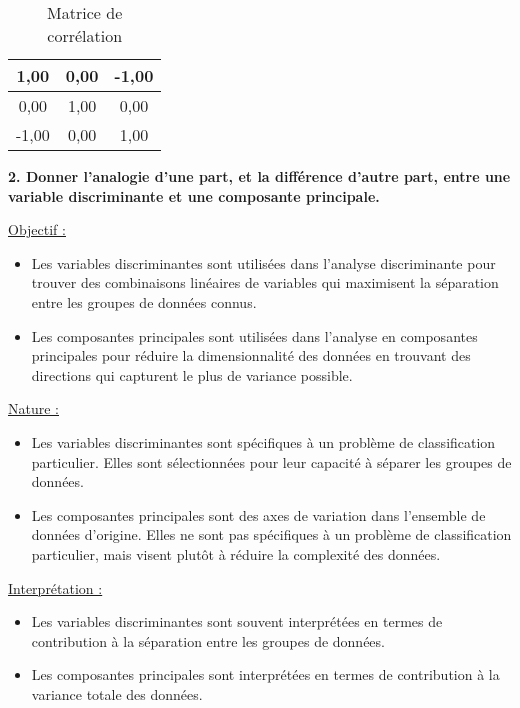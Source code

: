 \begin{table}[htbp]
	\centering
	\begin{tabular}{c|c|c}
		\hline
		1,00   & 0,00   & -1,00 \\ \hline
		0,00   & 1,00   & 0,00 \\ \hline
		-1,00  & 0,00   & 1,00 \\ \hline
	\end{tabular}%
	\caption{Matrice de corrélation}
\end{table}%




\noindent \textbf{2. Donner l’analogie d’une part, et la différence d’autre part, entre une variable discriminante et une composante principale.}


\noindent \underline{Objectif :}

\begin{itemize}
	\item Les variables discriminantes sont utilisées dans l'analyse discriminante pour trouver des combinaisons linéaires de variables qui maximisent la séparation entre les groupes de données connus.
	\item Les composantes principales sont utilisées dans l'analyse en composantes principales pour réduire la dimensionnalité des données en trouvant des directions qui capturent le plus de variance possible.
\end{itemize}

\noindent \underline{Nature :}

\begin{itemize}
	\item Les variables discriminantes sont spécifiques à un problème de classification particulier. Elles sont sélectionnées pour leur capacité à séparer les groupes de données.
	\item Les composantes principales sont des axes de variation dans l'ensemble de données d'origine. Elles ne sont pas spécifiques à un problème de classification particulier, mais visent plutôt à réduire la complexité des données.
\end{itemize}

\noindent \underline{Interprétation :}

\begin{itemize}
	\item Les variables discriminantes sont souvent interprétées en termes de contribution à la séparation entre les groupes de données.
	\item Les composantes principales sont interprétées en termes de contribution à la variance totale des données.
\end{itemize}

